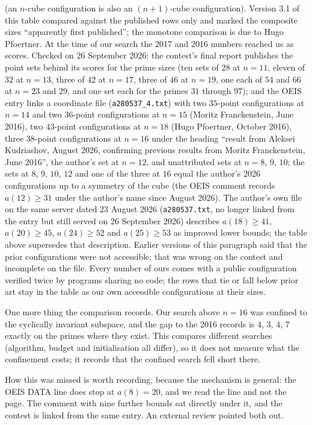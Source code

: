 \documentclass[11pt,a4paper]{article}
\begin{document}
(an $n$-cube configuration is also an $(n+1)$-cube configuration).  Version 3.1 of this table
compared against the published rows only and marked the composite sizes ``apparently first
published''; the monotone comparison is due to Hugo Pfoertner.  At the time of our search the 2017 and 2016
numbers reached us as scores.  Checked on 26 September 2026: the contest's final report publishes the point
sets behind its scores for the prime sizes (ten sets of $28$ at $n=11$, eleven of $32$ at $n=13$, three of $42$ at
$n=17$, three of $46$ at $n=19$, one each of $54$ and $66$ at $n=23$ and $29$, and one set each for the primes
$31$ through $97$); and the OEIS entry links a coordinate file (\texttt{a280537\_4.txt}) with two $35$-point configurations
at $n=14$ and two $36$-point configurations at $n=15$ (Moritz Franckenstein, June 2016), two $43$-point
configurations at $n=18$ (Hugo Pfoertner, October 2016), three $38$-point configurations at $n=16$ under the
heading ``result from Aleksei Kudriashov, August 2026, confirming previous results from Moritz Franckenstein,
June 2016'', the author's set at $n=12$, and unattributed sets at $n=8$, $9$, $10$; the sets at $8$, $9$, $10$, $12$
and one of the three at $16$ equal the author's 2026 configurations up to a symmetry of the cube (the OEIS
comment records $a(12)\ge31$ under the author's name since August 2026).  The author's own file on the same
server dated 23 August 2026 (\texttt{a280537.txt}, no longer linked from the entry but still served on
26 September 2026) describes $a(18)\ge41$, $a(20)\ge45$, $a(24)\ge52$ and $a(25)\ge53$ as improved lower
bounds; the table above supersedes that description.  Earlier versions of this paragraph said that the prior configurations were
not accessible; that was wrong on the contest and incomplete on the file.  Every number of ours comes with a
public configuration verified twice by programs sharing no code; the rows that tie or fall below prior art stay
in the table as our own accessible configurations at their sizes.

One more thing the comparison records.  Our search above $n=16$ was confined to the cyclically
invariant subspace, and the gap to the 2016 records is $4$, $3$, $4$, $7$ exactly on the primes where
they exist.  This compares different searches (algorithm, budget and initialisation all differ), so it
does not measure what the confinement costs; it records that the confined search fell short there.

How this was missed is worth recording, because the mechanism is general: the OEIS DATA line
does stop at $a(8)=20$, and we read the line and not the page.  The comment with nine further
bounds sat directly under it, and the contest is linked from the same entry.  An external
review pointed both out.
\end{document}
